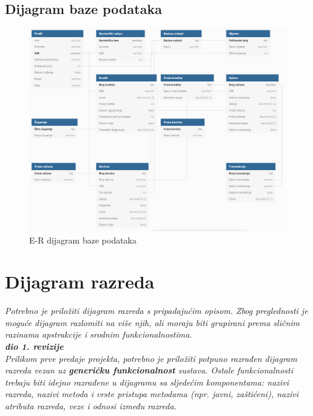 				
		
		
		
			
			\subsection{Dijagram baze podataka}
				\begin{figure}[H]
					\includegraphics[scale=0.75]{Slike/noviermodel.PNG}
					\centering
					\caption{E-R dijagram baze podataka}
					\label{fig:dijagram}
				\end{figure}
			\eject
			
			
		\section{Dijagram razreda}
		
			\textit{Potrebno je priložiti dijagram razreda s pripadajućim opisom. Zbog preglednosti je moguće dijagram razlomiti na više njih, ali moraju biti grupirani prema sličnim razinama apstrakcije i srodnim funkcionalnostima.}\\
			
			\textbf{\textit{dio 1. revizije}}\\
			
			\textit{Prilikom prve predaje projekta, potrebno je priložiti potpuno razrađen dijagram razreda vezan uz \textbf{generičku funkcionalnost} sustava. Ostale funkcionalnosti trebaju biti idejno razrađene u dijagramu sa sljedećim komponentama: nazivi razreda, nazivi metoda i vrste pristupa metodama (npr. javni, zaštićeni), nazivi atributa razreda, veze i odnosi između razreda.}\\
			

